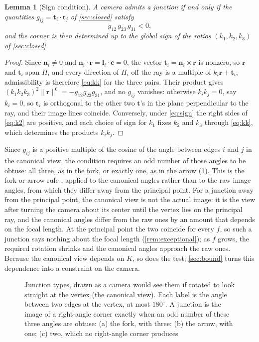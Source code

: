 \documentclass[pdflatex,sn-mathphys-num,iicol]{sn-jnl}
\newcommand{\vr}{\mathbf{r}}
\newcommand{\vt}{\mathbf{t}}
\newcommand{\vn}{\mathbf{n}}
\newcommand{\vl}{\mathbf{l}}
\newcommand{\vc}{\mathbf{c}}
\theoremstyle{thmstyleone}
\newtheorem{lemma}[theorem]{Lemma}
\theoremstyle{thmstylethree}
\theoremstyle{thmstyletwo}
\begin{document}
\begin{lemma}[Sign condition]\label{lem:sign}
A camera admits a junction if and only if the quantities $g_{ij}=\vt_i\cdot\vt_j$ of \cref{sec:closed} satisfy
\begin{equation}
g_{12}\,g_{23}\,g_{31}<0 ,
\label{eq:sign}
\end{equation}
and the corner is then determined up to the global sign of the ratios $(k_1,k_2,k_3)$ of \cref{sec:closed}.
\end{lemma}
\begin{proof}
Since $\vn_i\neq0$ and $\vn_i\cdot\vr=\vl_i\cdot\vc=0$, the vector $\vt_i=\vn_i\times\vr$ is nonzero, so $\vr$ and $\vt_i$ span $\Pi_i$ and every direction of $\Pi_i$ off the ray is a multiple of $k_i\vr+\vt_i$; admissibility is therefore \eqref{eq:kk} for the three pairs. Their product gives $(k_1k_2k_3)^2\|\vr\|^6=-g_{12}g_{23}g_{31}$, and no $g_{ij}$ vanishes: otherwise $k_ik_j=0$, say $k_i=0$, so $\vt_i$ is orthogonal to the other two $\vt$'s in the plane perpendicular to the ray, and their image lines coincide. Conversely, under \eqref{eq:sign} the right sides of \eqref{eq:k2} are positive, and each choice of sign for $k_1$ fixes $k_2$ and $k_3$ through \eqref{eq:kk}, which determines the products $k_ik_j$.
\end{proof}

Since $g_{ij}$ is a positive multiple of the cosine of the angle between edges $i$ and $j$ in the canonical view, the condition requires an odd number of those angles to be obtuse: all three, as in the fork, or exactly one, as in the arrow (\cref{fig:junctions}). This is the fork-or-arrow rule \citep{kanatani1986,kanatani1988,shakunaga1989}, applied to the canonical angles rather than to the raw image angles, from which they differ away from the principal point. For a junction away from the principal point, the canonical view is not the actual image: it is the view after turning the camera about its center until the vertex lies on the principal ray, and the canonical angles differ from the raw ones by an amount that depends on the focal length. At the principal point the two coincide for every $f$, so such a junction says nothing about the focal length (\cref{rem:exceptional}); as $f$ grows, the required rotation shrinks and the canonical angles approach the raw ones. Because the canonical view depends on $K$, so does the test; \cref{sec:bound} turns this dependence into a constraint on the camera.

\begin{figure}[t]
\centering

\caption{Junction types, drawn as a camera would see them if rotated to look straight at the vertex (the canonical view). Each label is the angle between two edges at the vertex, at most $180^\circ$. A junction is the image of a right-angle corner exactly when an odd number of these three angles are obtuse: (a) the fork, with three; (b) the arrow, with one; (c) two, which no right-angle corner produces}
\label{fig:junctions}
\end{figure}
\end{document}
